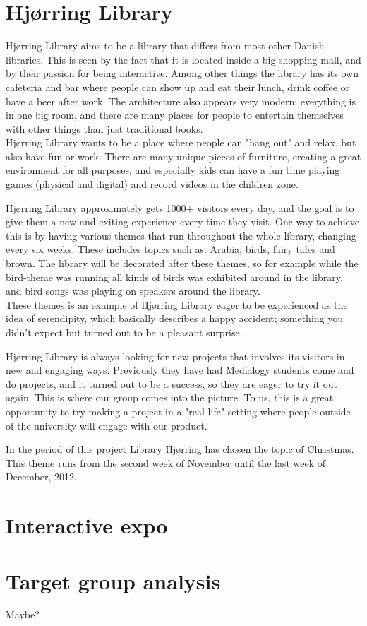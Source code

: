\section{Hj{\o}rring Library}
Hj{\o}rring Library aims to be a library that differs from most other Danish libraries. This is seen by the fact that it is located inside a big shopping mall, and by their passion for being interactive. Among other things the library has its own cafeteria and bar where people can show up and eat their lunch, drink coffee or have a beer after work. The architecture also appears very modern; everything is in one big room, and there are many places for people to entertain themselves with other things than just traditional books. \\ Hj{\o}rring Library wants to be a place where people can "hang out" and relax, but also have fun or work. There are many unique pieces of furniture, creating a great environment for all purposes, and especially kids can have a fun time playing games (physical and digital) and record videos in the children zone.

Hj{\o}rring Library approximately gets 1000+ visitors every day, and the goal is to give them a new and exiting experience every time they visit. One way to achieve this is by having various themes that run throughout the whole library, changing every six weeks. These includes topics such as: Arabia, birds, fairy tales and brown. The library will be decorated after these themes, so for example while the bird-theme was running all kinds of birds was exhibited around in the library, and bird songs was playing on speakers around the library.\\
These themes is an example of Hj{\o}rring Library eager to be experienced as the idea of serendipity, which basically describes a happy accident; something you didn't expect but turned out to be a pleasant surprise.

Hj{\o}rring Library is always looking for new projects that involves its visitors in new and engaging ways. Previously they have had Medialogy students come and do projects, and it turned out to be a success, so they are eager to try it out again. This is where our group comes into the picture. To us, this is a great opportunity to try making a project in a "real-life" setting where people outside of the university will engage with our product.

In the period of this project Library Hj{\o}rring has chosen the topic of Christmas. This theme runs from the second week of November until the last week of December, 2012.

\section{Interactive expo}

\section{Target group analysis}
Maybe?